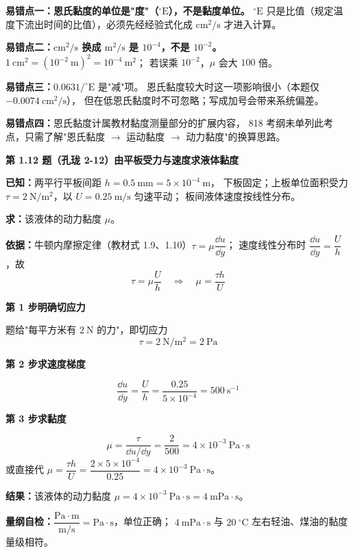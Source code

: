 \begin{yicuo}
\textbf{易错点一：恩氏黏度的单位是"度"（$^{\circ}\mathrm{E}$），不是黏度单位。}
$^{\circ}\mathrm{E}$ 只是比值（规定温度下流出时间的比值），必须先经经验式化成
$\mathrm{cm^2/s}$ 才进入计算。

\textbf{易错点二：$\mathrm{cm^2/s}$ 换成 $\mathrm{m^2/s}$ 是 $10^{-4}$，不是 $10^{-2}$。}
$1\ \mathrm{cm^2}=(10^{-2}\ \mathrm{m})^2=10^{-4}\ \mathrm{m^2}$；
若误乘 $10^{-2}$，$\mu$ 会大 $100$ 倍。

\textbf{易错点三：}$0.0631/^{\circ}\mathrm{E}$ 是"减"项。
恩氏黏度较大时这一项影响很小（本题仅 $-0.0074\ \mathrm{cm^2/s}$），
但在低恩氏黏度时不可忽略；写成加号会带来系统偏差。

\textbf{易错点四：}恩氏黏度计属教材黏度测量部分的扩展内容，
818 考纲未单列此考点，只需了解"恩氏黏度 $\to$ 运动黏度 $\to$ 动力黏度"的换算思路。
\end{yicuo}

\noindent\textbf{第 1.12 题（孔珑 2-12）\quad 由平板受力与速度求液体黏度}

\begin{jie}
\textbf{已知：}两平行平板间距 $h=0.5\ \mathrm{mm}=5\times10^{-4}\ \mathrm{m}$，
下板固定；上板单位面积受力 $\tau=2\ \mathrm{N/m^2}$，以 $U=0.25\ \mathrm{m/s}$ 匀速平动；
板间液体速度按线性分布。

\textbf{求：}该液体的动力黏度 $\mu$。

\textbf{依据：}牛顿内摩擦定律（教材式 1.9、1.10）$\tau=\mu\dfrac{\dd u}{\dd y}$；
速度线性分布时 $\dfrac{\dd u}{\dd y}=\dfrac{U}{h}$，故
\[ \tau=\mu\frac{U}{h}\quad\Longrightarrow\quad \mu=\frac{\tau h}{U} \]

\textbf{第 1 步\quad 明确切应力}

题给"每平方米有 $2\ \mathrm{N}$ 的力"，即切应力
\[ \tau=2\ \mathrm{N/m^2}=2\ \mathrm{Pa} \]

\textbf{第 2 步\quad 求速度梯度}

\[ \frac{\dd u}{\dd y}=\frac{U}{h}=\frac{0.25}{5\times10^{-4}}=500\ \mathrm{s^{-1}} \]

\textbf{第 3 步\quad 求黏度}

\[ \mu=\frac{\tau}{\dd u/\dd y}=\frac{2}{500}=4\times10^{-3}\ \mathrm{Pa\cdot s} \]
或直接代 $\mu=\dfrac{\tau h}{U}=\dfrac{2\times5\times10^{-4}}{0.25}=4\times10^{-3}\ \mathrm{Pa\cdot s}$。

\textbf{结果：}该液体的动力黏度 $\mu=4\times10^{-3}\ \mathrm{Pa\cdot s}=4\ \mathrm{mPa\cdot s}$。

\textbf{量纲自检：}$\dfrac{\mathrm{Pa}\cdot\mathrm{m}}{\mathrm{m/s}}
=\mathrm{Pa\cdot s}$，单位正确；
$4\ \mathrm{mPa\cdot s}$ 与 $20\ ^{\circ}\mathrm{C}$ 左右轻油、煤油的黏度量级相符。
\end{jie}

